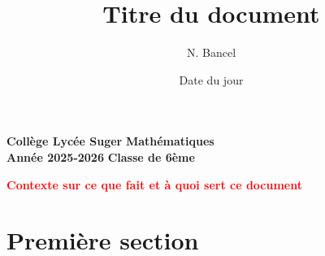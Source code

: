 \documentclass[answers]{exam}
\title{Titre du document}
\author{N. Bancel}
\date{Date du jour}
\begin{document}
\textbf{Collège Lycée Suger}
\hfill
\textbf{Mathématiques} \\

\textbf{Année 2025-2026}
\hfill
\textbf{Classe de 6ème} \par

{\let\newpage\relax\maketitle}

\begin{center}
  \textbf{\textcolor{red}{Contexte sur ce que fait et à quoi sert ce document}} \\
\end{center}

\section{Première section}
\end{document}
